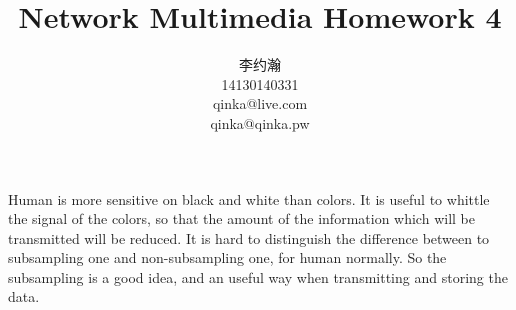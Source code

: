 \documentclass{ctexart}
\title{Network Multimedia Homework 4}
\author{李约瀚 \\ 14130140331 \\ qinka@live.com \\ qinka@qinka.pw}
\begin{document}
    \maketitle
    
    Human is more sensitive on black and white than colors. It is useful to whittle the signal of the colors,
    so that the amount of the information which will be transmitted will be reduced. 
    It is hard to distinguish the difference between to subsampling one and non-subsampling one, for human normally.
    So the subsampling is a good idea, and an useful
    way when transmitting and storing the data.
\end{document}
